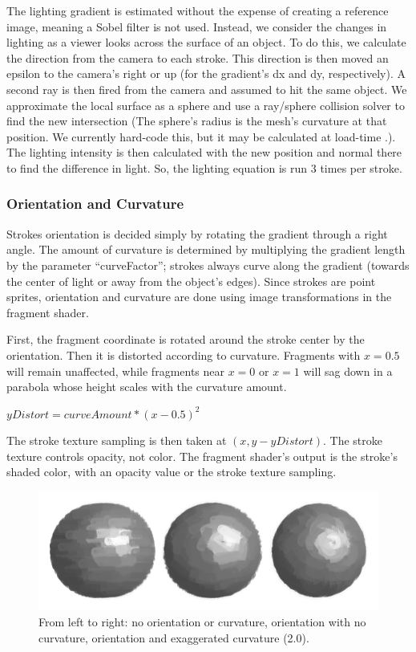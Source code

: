 \documentclass[conference]{acmsiggraph}
\begin{document}
The lighting gradient is estimated without the expense of creating a reference
image, meaning a Sobel filter is not used. Instead, we consider the changes in
lighting as a viewer looks across the surface of an object. To do this, we
calculate the direction from the camera to each stroke. This direction is then
moved an epsilon to the camera's right or up (for the gradient's dx and dy,
respectively). A second ray is then fired from the camera and assumed to hit
the same object. We approximate the local surface as a sphere and use a
ray/sphere collision solver to find the new intersection (The sphere's radius
is the mesh's curvature at that position. We currently hard-code this, but it
may be calculated at load-time \cite{gatzke2006estimating}.). The lighting
intensity is then calculated with the new position and normal there to find
the difference in light. So, the lighting equation is run 3 times per stroke.


\subsubsection{Orientation and Curvature}

Strokes orientation is decided simply by rotating the gradient through a right
angle. The amount of curvature is determined by multiplying the gradient length
by the parameter ``curveFactor''; strokes always curve along the gradient
(towards the center of light or away from the object's edges). Since strokes
are point sprites, orientation and curvature are done using image
transformations in the fragment shader.

First, the fragment coordinate is rotated around the stroke center by the
orientation. Then it is distorted according to curvature. Fragments with
$x = 0.5$ will remain unaffected, while fragments near $x = 0$ or $x = 1$ will
sag down in a parabola whose height scales with the curvature amount.

$yDistort = curveAmount * (x - 0.5)^2$

The stroke texture sampling is then taken at $(x, y - yDistort)$. The stroke
texture controls opacity, not color. The fragment shader's output is the
stroke's shaded color, with an opacity value or the stroke texture sampling.


\begin{figure}[ht]
  \centering
  \includegraphics[width=6.0in]{images/sphere_rotation_curve}
  \caption{From left to right: no orientation or curvature, orientation with
           no curvature, orientation and exaggerated curvature (2.0).}
\end{figure}
\end{document}
